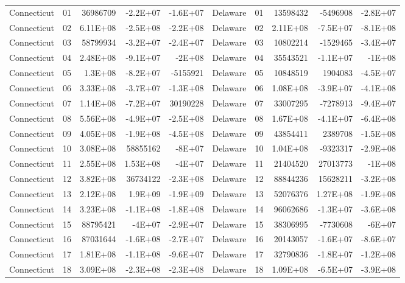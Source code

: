 \begin{landscape}
\begin{singlespace}
\begin{longtable}{lrrrr|lrrrr}
		Connecticut &  01  & 36986709 & -2.2E+07 & -1.6E+07 & Delaware &  01  & 13598432 & -5496908 & -2.8E+07 \\
		Connecticut &  02  & 6.11E+08 & -2.5E+08 & -2.2E+08 & Delaware &  02  & 2.11E+08 & -7.5E+07 & -8.1E+08 \\
		Connecticut &  03  & 58799934 & -3.2E+07 & -2.4E+07 & Delaware &  03  & 10802214 & -1529465 & -3.4E+07 \\
		Connecticut &  04  & 2.48E+08 & -9.1E+07 & -2E+08 & Delaware &  04  & 35543521 & -1.1E+07 & -1E+08 \\
		Connecticut &  05  & 1.3E+08 & -8.2E+07 & -5155921 & Delaware &  05  & 10848519 & 1904083 & -4.5E+07 \\
		Connecticut &  06  & 3.33E+08 & -3.7E+07 & -1.3E+08 & Delaware &  06  & 1.08E+08 & -3.9E+07 & -4.1E+08 \\
		Connecticut &  07  & 1.14E+08 & -7.2E+07 & 30190228 & Delaware &  07  & 33007295 & -7278913 & -9.4E+07 \\
		Connecticut &  08  & 5.56E+08 & -4.9E+07 & -2.5E+08 & Delaware &  08  & 1.67E+08 & -4.1E+07 & -6.4E+08 \\
		Connecticut &  09  & 4.05E+08 & -1.9E+08 & -4.5E+08 & Delaware &  09  & 43854411 & 2389708 & -1.5E+08 \\
		Connecticut &  10 & 3.08E+08 & 58855162 & -8E+07 & Delaware &  10 & 1.04E+08 & -9323317 & -2.9E+08 \\
		Connecticut &  11 & 2.55E+08 & 1.53E+08 & -4E+07 & Delaware &  11 & 21404520 & 27013773 & -1E+08 \\
		Connecticut &  12 & 3.82E+08 & 36734122 & -2.3E+08 & Delaware &  12 & 88844236 & 15628211 & -3.2E+08 \\
		Connecticut &  13 & 2.12E+08 & 1.9E+09 & -1.9E+09 & Delaware &  13 & 52076376 & 1.27E+08 & -1.9E+08 \\
		Connecticut &  14 & 3.23E+08 & -1.1E+08 & -1.8E+08 & Delaware &  14 & 96062686 & -1.3E+07 & -3.6E+08 \\
		Connecticut &  15 & 88795421 & -4E+07 & -2.9E+07 & Delaware &  15 & 38306995 & -7730608 & -6E+07 \\
		Connecticut &  16 & 87031644 & -1.6E+08 & -2.7E+07 & Delaware &  16 & 20143057 & -1.6E+07 & -8.6E+07 \\
		Connecticut &  17 & 1.81E+08 & -1.1E+08 & -9.6E+07 & Delaware &  17 & 32790836 & -1.8E+07 & -1.2E+08 \\
		Connecticut &  18 & 3.09E+08 & -2.3E+08 & -2.3E+08 & Delaware &  18 & 1.09E+08 & -6.5E+07 & -3.9E+08 \\

\end{longtable}
\end{singlespace}
\end{landscape}
